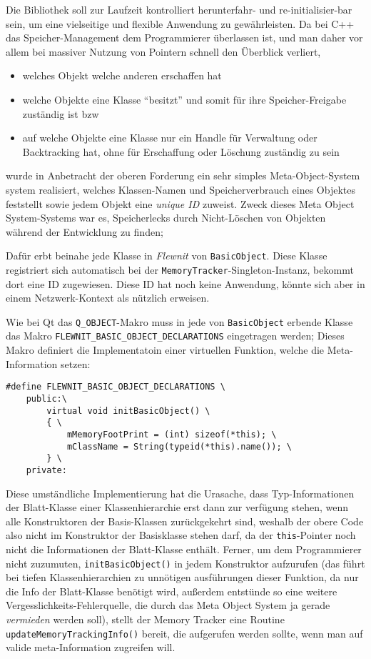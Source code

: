 	Die Bibliothek soll zur Laufzeit kontrolliert herunterfahr- und re-initialisier-bar sein, 
	um eine vielseitige und flexible Anwendung zu gewährleisten. Da bei C++ das Speicher-Management dem
	Programmierer überlassen ist, und man daher vor allem bei massiver Nutzung von Pointern schnell den Überblick
	verliert, 
	\begin{itemize}
		\item welches Objekt welche anderen erschaffen hat
		\item welche Objekte eine Klasse "`besitzt"' und somit für ihre Speicher-Freigabe zuständig ist bzw
		\item auf welche Objekte eine Klasse nur ein Handle für Verwaltung oder	Backtracking hat, ohne für Erschaffung
		 oder Löschung zuständig zu sein
	\end{itemize}
	wurde in Anbetracht der oberen Forderung ein sehr simples Meta-Object-System system realisiert, welches Klassen-Namen
	und Speicherverbrauch eines Objektes feststellt sowie jedem Objekt eine \emph{unique ID} zuweist.
	Zweck dieses Meta Object System-Systems war es, Speicherlecks durch Nicht-Löschen von Objekten während der Entwicklung 
	zu finden;
	
	Dafür erbt beinahe jede Klasse in \emph{Flewnit} von \lstinline|BasicObject|.
	Diese Klasse registriert sich automatisch bei der \lstinline|MemoryTracker|-Singleton-Instanz, bekommt dort eine
	ID zugewiesen. Diese ID hat noch keine Anwendung, könnte sich aber in einem Netzwerk-Kontext als nützlich erweisen.

	Wie bei Qt das \lstinline[language=C++]|Q_OBJECT|-Makro muss in jede von 
	\lstinline[language=C++]|BasicObject| erbende Klasse das Makro 
	\lstinline[language=C++]|FLEWNIT_BASIC_OBJECT_DECLARATIONS| eingetragen werden; Dieses Makro definiert die 
	Implementatoin einer virtuellen Funktion, welche die Meta-Information setzen:
    \begin{lstlisting}
#define FLEWNIT_BASIC_OBJECT_DECLARATIONS \
	public:\
		virtual void initBasicObject() \
		{ \
			mMemoryFootPrint = (int) sizeof(*this); \
			mClassName = String(typeid(*this).name()); \
		} \
	private:	
	\end{lstlisting}
	Diese umständliche Implementierung hat die Urasache, dass Typ-Informationen der Blatt-Klasse einer
	Klassenhierarchie erst dann zur verfügung stehen, wenn alle Konstruktoren der Basis-Klassen zurückgekehrt sind,
	weshalb der obere Code also nicht im Konstruktor der Basisklasse stehen darf, da der \lstinline|this|-Pointer
	noch nicht die Informationen der Blatt-Klasse enthält.
	Ferner, um dem Programmierer nicht zuzumuten, \lstinline|initBasicObject()| in jedem Konstruktor aufzurufen
	(das führt bei tiefen Klassenhierarchien zu unnötigen ausführungen dieser Funktion, da nur die Info der Blatt-Klasse
	benötigt wird, außerdem entstünde so eine weitere Vergesslichkeits-Fehlerquelle, die durch das Meta Object System ja 
	gerade \emph{vermieden} werden soll), stellt der Memory Tracker eine Routine \lstinline|updateMemoryTrackingInfo()|
	bereit, die aufgerufen werden sollte, wenn man auf valide meta-Information zugreifen will.
	
